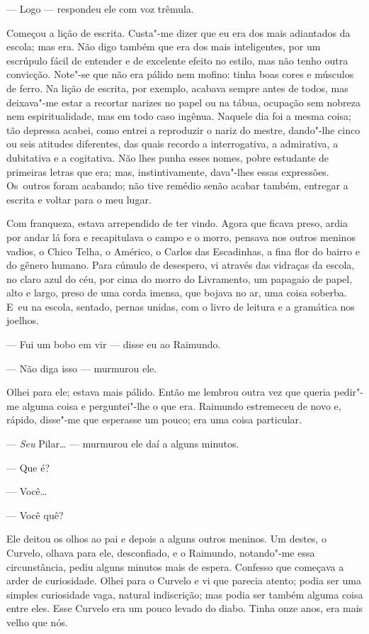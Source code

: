 \begin{linenumbers}
--- Logo --- respondeu ele com voz trêmula.

Começou a lição de escrita. Custa"-me dizer que eu era dos mais
adiantados da escola; mas era. Não digo também que era dos mais
inteligentes, por um escrúpulo fácil de entender e de excelente efeito
no estilo, mas não tenho outra convicção. Note"-se que não era pálido nem
mofino: tinha boas cores e músculos de ferro. Na lição de escrita, por
exemplo, acabava sempre antes de todos, mas deixava"-me estar a recortar
narizes no papel ou na tábua, ocupação sem nobreza nem espiritualidade,
mas em todo caso ingênua. Naquele dia foi a mesma coisa; tão depressa
acabei, como entrei a reproduzir o nariz do mestre, dando"-lhe cinco ou
seis atitudes diferentes, das quais recordo a interrogativa, a
admirativa, a dubitativa e a cogitativa. Não lhes punha esses nomes,
pobre estudante de primeiras letras que era; mas, instintivamente,
dava"-lhes essas expressões. Os~outros foram acabando; não tive remédio
senão acabar também, entregar a escrita e voltar para o meu lugar.

Com franqueza, estava arrependido de ter vindo. Agora que ficava preso,
ardia por andar lá fora e recapitulava o campo e o morro, pensava nos
outros meninos vadios, o Chico Telha, o Américo, o Carlos das
Escadinhas, a fina flor do bairro e do gênero humano. Para cúmulo de
desespero, vi através das vidraças da escola, no claro azul do céu, por
cima do morro do Livramento, um papagaio de papel, alto e largo, preso
de uma corda imensa, que bojava no ar, uma coisa soberba. E~eu na
escola, sentado, pernas unidas, com o livro de leitura e a gramática nos
joelhos.

--- Fui um bobo em vir --- disse eu ao Raimundo.

--- Não diga isso --- murmurou ele.

Olhei para ele; estava mais pálido. Então me lembrou outra vez que
queria pedir"-me alguma coisa e perguntei"-lhe o que era. Raimundo
estremeceu de novo e, rápido, disse"-me que esperasse um pouco; era uma
coisa particular.

--- \emph{Seu} Pilar\ldots{} --- murmurou ele daí a alguns minutos.

--- Que é?

--- Você\ldots{}

--- Você quê?

Ele deitou os olhos ao pai e depois a alguns outros meninos. Um destes,
o Curvelo, olhava para ele, desconfiado, e o Raimundo, notando"-me essa
circunstância, pediu alguns minutos mais de espera. Confesso que
começava a arder de curiosidade. Olhei para o Curvelo e vi que parecia
atento; podia ser uma simples curiosidade vaga, natural indiscrição; mas
podia ser também alguma coisa entre eles. Esse Curvelo era um pouco
levado do diabo. Tinha onze anos, era mais velho que nós.


\end{linenumbers}
